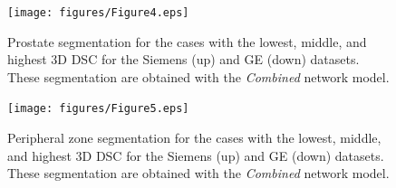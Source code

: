 \begin{figure}[ht]
    \centering
    \texttt{[image: figures/Figure4.eps]}
    \caption{Prostate segmentation for the cases with the lowest, middle, and highest 3D DSC for the Siemens (up) and GE (down) datasets. These segmentation are obtained with the \emph{Combined} network model.  }
    \label{fig:resseg}
\end{figure} 

\begin{figure}[ht]
    \centering
    \texttt{[image: figures/Figure5.eps]}
    \caption{Peripheral zone segmentation for the cases with the lowest, middle, and highest 3D DSC for the Siemens (up) and GE (down) datasets. These segmentation are obtained with the \emph{Combined} network model.  }
    \label{fig:ressegpz}
\end{figure} 
